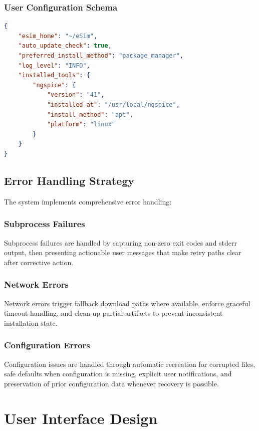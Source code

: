 \documentclass[12pt,a4paper]{report}
\begin{document}
\subsection{User Configuration Schema}
\begin{lstlisting}[language=json, caption={User Configuration Structure}]
{
    "esim_home": "~/eSim",
    "auto_update_check": true,
    "preferred_install_method": "package_manager",
    "log_level": "INFO",
    "installed_tools": {
        "ngspice": {
            "version": "41",
            "installed_at": "/usr/local/ngspice",
            "install_method": "apt",
            "platform": "linux"
        }
    }
}
\end{lstlisting}

\section{Error Handling Strategy}
The system implements comprehensive error handling:

\subsection{Subprocess Failures}
Subprocess failures are handled by capturing non-zero exit codes and stderr output, then presenting actionable user messages that make retry paths clear after corrective action.

\subsection{Network Errors}
Network errors trigger fallback download paths where available, enforce graceful timeout handling, and clean up partial artifacts to prevent inconsistent installation state.

\subsection{Configuration Errors}
Configuration issues are handled through automatic recreation for corrupted files, safe defaults when configuration is missing, explicit user notifications, and preservation of prior configuration data whenever recovery is possible.

\chapter{User Interface Design}
\end{document}
